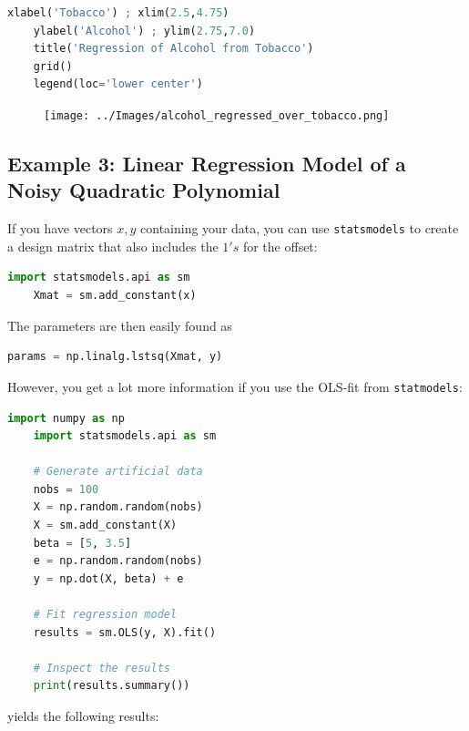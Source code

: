 \begin{lstlisting}[language=Python]
    xlabel('Tobacco') ; xlim(2.5,4.75)
    ylabel('Alcohol') ; ylim(2.75,7.0)
    title('Regression of Alcohol from Tobacco')
    grid()
    legend(loc='lower center')
\end{lstlisting}

\begin{figure}
  \centering
  \texttt{[image: ../Images/alcohol\_regressed\_over\_tobacco.png]}
\end{figure}

\subsection{Example 3: Linear Regression Model of a Noisy Quadratic Polynomial}

If you have vectors $x,y$ containing your data, you can use \texttt{statsmodels} to create a design matrix that also includes the $1's$ for the offset:

\begin{lstlisting}[language=Python]
    import statsmodels.api as sm
    Xmat = sm.add_constant(x)
\end{lstlisting}

The parameters are then easily found as

\begin{lstlisting}[language=Python]
    params = np.linalg.lstsq(Xmat, y)
\end{lstlisting}

However, you get a lot more information if you use the OLS-fit from \texttt{statmodels}:

\begin{lstlisting}[language=Python]
    import numpy as np
    import statsmodels.api as sm

    # Generate artificial data
    nobs = 100
    X = np.random.random(nobs)
    X = sm.add_constant(X)
    beta = [5, 3.5]
    e = np.random.random(nobs)
    y = np.dot(X, beta) + e

    # Fit regression model
    results = sm.OLS(y, X).fit()

    # Inspect the results
    print(results.summary())
\end{lstlisting}

yields the following results:

